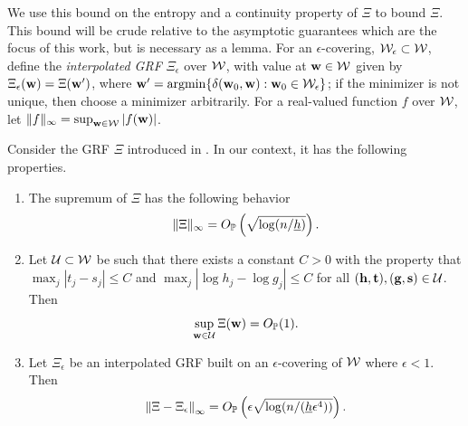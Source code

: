 \documentclass[twoside,11pt]{article}
\begin{document}
We use this bound on the entropy and a continuity property of $\Xi$ to bound $\Xi$.
This bound will be crude relative to the asymptotic guarantees which are the focus of this work, but is necessary as a lemma.
For an $\epsilon$-covering, $\mathcal{W}_\epsilon \subset \mathcal{W}$, define the {\em interpolated GRF} $\Xi_\epsilon$ over $\mathcal{W}$, with value at $\mathbf{w} \in \mathcal{W}$ given by $\Xi_\epsilon(\mathbf{w}) = \Xi(\mathbf{w}')$, where $\mathbf{w}' = \mathop{\mathrm{argmin}}\{ \delta(\mathbf{w}_0,\mathbf{w}) : \mathbf{w}_0 \in \mathcal{W}_\epsilon \}$; if the minimizer is not unique, then choose a minimizer arbitrarily.
For a real-valued function $f$ over $\mathcal{W}$, let $\|f\|_\infty = \sup_{\mathbf{w} \in \mathcal{W}} |f(\mathbf{w})|$.

\begin{lemma}
\label{lem:xi_bound}
Consider the GRF $\Xi$ introduced in .  
In our context, it has the following properties.
\begin{enumerate}
\item The supremum of $\Xi$ has the following behavior
\[
\|\Xi\|_\infty = O_{\mathbb{P}}\left( \sqrt{ \log(n/\underline h)} \right).
\]
\item Let $\mathcal{U} \subset \mathcal{W}$ be such that there exists a constant $C > 0$ with the property that $\max_j |t_j - s_j| \le C$ and $\max_j |\log h_j - \log g_j| \le C$ for all $(\mathbf{h},\mathbf{t}), (\mathbf{g},\mathbf{s}) \in \mathcal{U}$.
Then 
\[
\sup_{\mathbf{w} \in \mathcal{U}} \Xi(\mathbf{w}) = O_{\mathbb{P}} ( 1 ).
\]
\item Let $\Xi_\epsilon$ be an interpolated GRF built on an $\epsilon$-covering of $\mathcal{W}$ where $\epsilon < 1$.  Then
\[
\left\|\Xi - \Xi_\epsilon\right\|_\infty = O_{\mathbb{P}} \left(\epsilon \sqrt{ \log (n/(\underline h \epsilon^4))}\right).
\]
\end{enumerate}
\end{lemma}
\end{document}
